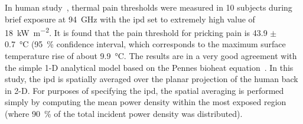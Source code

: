 In human study~\cite{Walters2000Heating}, thermal pain thresholds were measured in 10 subjects during brief exposure at \SI{94}{\GHz} with the \gls{ipd} set to extremely high value of \SI{18}{\kW\per\meter\squared}.
It is found that the pain threshold for pricking pain is \SI{43.9}{} $\pm$ \SI{0.7}{\celsius} (\SI{95}{\percent} confidence interval, which corresponds to the maximum surface temperature rise of about \SI{9.9}{\celsius}.
The results are in a very good agreement with the simple 1-D analytical model based on the Pennes bioheat equation~\cite{Pennes1948Analysis}.
In this study, the \gls{ipd} is spatially averaged over the planar projection of the human back in 2-D.
For purposes of specifying the \gls{ipd}, the spatial averaging is performed simply by computing the mean power density within the most exposed region (where \SI{90}{\percent} of the total incident power density was distributed).

